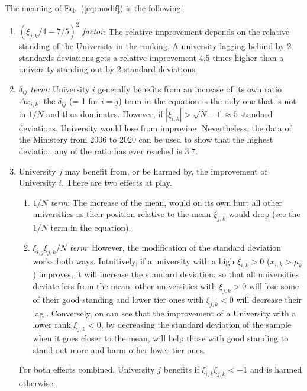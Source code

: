\documentclass[twocolumn]{article}
\def\eqref#1{Eq.~(\ref{eq:#1})}
\begin{document}
The meaning of \eqref{modif} is the following:
\begin{enumerate}
    \item \emph{$(\xi_{j,k}/4 - 7/5)^2$ factor}:  The relative improvement depends on the relative standing of the University in the ranking.  A university lagging behind by 2 standards deviations gets a relative improvement 4,5 times higher than a university standing out by 2 standard deviations.
    \item \emph{$\delta_{ij}$ term:} University $i$ generally benefits from an increase of its own ratio $\Delta x_{i,k}$: the $\delta_{ij}$ (= 1 for $i = j$) term in the equation is the only one that is not in $1/N$ and thus dominates. However, if $|\xi_{i,k}| > \sqrt{N - 1} \approx 5$ standard deviations, University would lose from improving.  Nevertheless, the data of the Ministery from 2006 to 2020 can be used to show that the highest deviation any of the ratio has ever reached is 3.7.
    \item University $j$ may benefit from, or be harmed by, the improvement of University $i$.  There are two effects at play.  
    \begin{enumerate}
    \item \emph{$1/N$ term}: The increase of the mean, would on its own hurt all other universities as their position relative to the mean $\xi_{j,k}$ would drop (see the $1/N$ term in the equation).  
    \item \emph{$\xi_{i,j}\xi_{j,k}/N$ term}: However, the modification of the standard deviation works both ways. Intuitively, if a university with a high $\xi_{i,k} > 0$ ($x_{i,k} > \mu_k$) improves, it will increase the standard deviation, so that all universities deviate less from the mean: other universities with $\xi_{j,k} > 0$ will lose some of their good standing and lower tier ones with $\xi_{j,k} < 0$ will decrease their lag . Conversely, on can see that the improvement of a University with a lower rank $\xi_{j,k} < 0$, by decreasing the standard deviation of the sample when it goes closer to the mean, will help those with good standing to stand out more and harm other lower tier ones. 
\end{enumerate}
    For both effects combined, University $j$ benefits if $\xi_{i,k}\xi_{j,k} < -1$ and is harmed otherwise. 
\end{enumerate}
\end{document}
